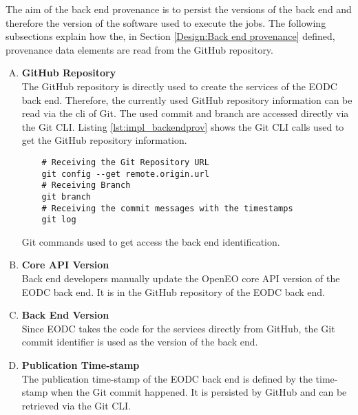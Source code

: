 \documentclass[draft,final]{vutinfth} %
\newenvironment{code}{\captionsetup{type=listing}}{}
\begin{document}
The aim of the back end provenance is to persist the versions of the back end and therefore the version of the software used to execute the jobs. The following subsections explain how the, in Section \ref{Design:Back end provenance} defined, provenance data elements are read from the GitHub repository.  
\begin{enumerate}[(A)]
\item \textbf{GitHub Repository} \\
	The GitHub repository is directly used to create the services of the EODC back end. Therefore, the currently used GitHub repository information can be read via the \gls{cli} of Git. The used commit and branch are accessed directly via the Git CLI. Listing \ref{lst:impl_backendprov} shows the Git CLI calls used to get the GitHub repository information.       

\begin{code}
	\begin{verbatim}
	# Receiving the Git Repository URL
	git config --get remote.origin.url 
	# Receiving Branch
	git branch
	# Receiving the commit messages with the timestamps
	git log 
	\end{verbatim}
	\caption{Git commands used to get access the back end identification.}
	\label{lst:impl_backendprov}
\end{code}

\item \textbf{Core API Version} \\
	Back end developers manually update the OpenEO core API version of the EODC back end. It is in the GitHub repository of the EODC back end. 

\item \textbf{Back End Version} \\
	Since EODC takes the code for the services directly from GitHub, the Git commit identifier is used as the version of the back end.

\item \textbf{Publication Time-stamp} \\
	The publication time-stamp of the EODC back end is defined by the time-stamp when the Git commit happened. It is persisted by GitHub and can be retrieved via the Git CLI. 
\end{enumerate}
\end{document}
